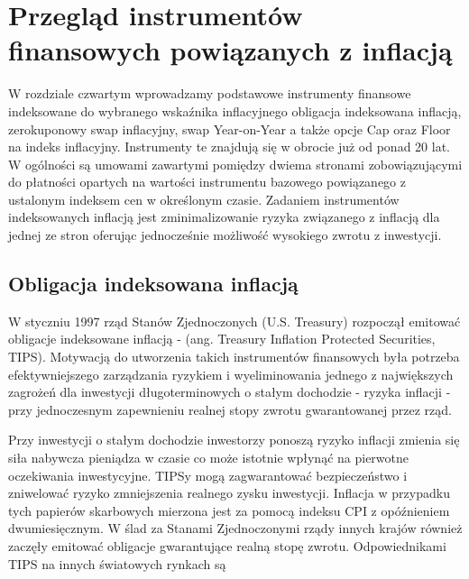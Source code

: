 \documentclass{mini}
\theoremstyle{mythstyle}
\begin{document}
\chapter{Przegląd instrumentów finansowych powiązanych z inflacją}

	W rozdziale czwartym wprowadzamy podstawowe instrumenty finansowe indeksowane do wybranego wskaźnika inflacyjnego obligacja indeksowana inflacją, zerokuponowy swap inflacyjny, swap Year-on-Year a także opcje Cap oraz Floor na indeks inflacyjny. Instrumenty te znajdują się w obrocie już od ponad 20 lat. W ogólności są umowami zawartymi pomiędzy dwiema stronami zobowiązującymi do płatności opartych na wartości instrumentu bazowego powiązanego z ustalonym indeksem cen w określonym czasie. Zadaniem instrumentów indeksowanych inflacją jest zminimalizowanie ryzyka związanego z inflacją dla jednej ze stron oferując jednocześnie możliwość wysokiego zwrotu z inwestycji.
	
	\section{Obligacja indeksowana inflacją}
	
	W styczniu 1997 rząd Stanów Zjednoczonych (U.S. Treasury) rozpoczął emitować obligacje indeksowane inflacją - (ang. Treasury Inflation Protected Securities, TIPS). Motywacją do utworzenia takich instrumentów finansowych była potrzeba efektywniejszego zarządzania ryzykiem i wyeliminowania jednego z największych zagrożeń dla inwestycji długoterminowych o stałym dochodzie - ryzyka inflacji - przy jednoczesnym zapewnieniu realnej stopy zwrotu gwarantowanej przez rząd. 
	
	Przy inwestycji o stałym dochodzie inwestorzy ponoszą ryzyko inflacji zmienia się siła nabywcza pieniądza w czasie co może istotnie wpłynąć na pierwotne oczekiwania inwestycyjne. TIPSy mogą zagwarantować bezpieczeństwo i zniwelować ryzyko zmniejszenia realnego zysku inwestycji. Inflacja w przypadku tych papierów skarbowych mierzona jest za pomocą indeksu CPI z opóźnieniem dwumiesięcznym. W ślad za Stanami Zjednoczonymi rządy innych krajów również zaczęły emitować obligacje gwarantujące realną stopę zwrotu. Odpowiednikami TIPS na innych światowych rynkach są
	
\end{document}

